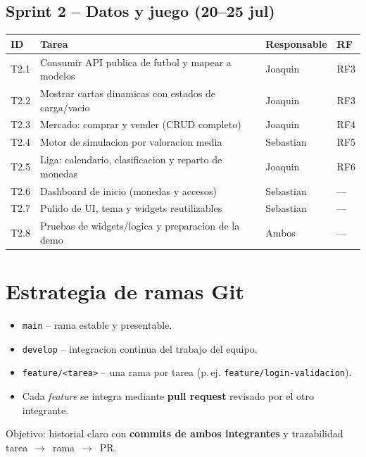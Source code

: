 \documentclass[11pt,a4paper]{article}
\begin{document}
\subsection{Sprint 2 -- Datos y juego (20--25 jul)}
\renewcommand{\arraystretch}{1.3}
\begin{longtable}{@{}C{1.2cm} L{7.6cm} L{3.4cm} C{2.2cm}@{}}
\toprule
\textbf{ID} & \textbf{Tarea} & \textbf{Responsable} & \textbf{RF} \\
\midrule
\endhead
T2.1 & Consumir API publica de futbol y mapear a modelos & Joaquin & RF3 \\
T2.2 & Mostrar cartas dinamicas con estados de carga/vacio & Joaquin & RF3 \\
T2.3 & Mercado: comprar y vender (CRUD completo) & Joaquin & RF4 \\
T2.4 & Motor de simulacion por valoracion media & Sebastian & RF5 \\
T2.5 & Liga: calendario, clasificacion y reparto de monedas & Joaquin & RF6 \\
T2.6 & Dashboard de inicio (monedas y accesos) & Sebastian & --- \\
T2.7 & Pulido de UI, tema y widgets reutilizables & Sebastian & --- \\
T2.8 & Pruebas de widgets/logica y preparacion de la demo & Ambos & --- \\
\bottomrule
\end{longtable}

\section{Estrategia de ramas Git}
\begin{itemize}[leftmargin=1.2em]
  \item \texttt{main} -- rama estable y presentable.
  \item \texttt{develop} -- integracion continua del trabajo del equipo.
  \item \texttt{feature/<tarea>} -- una rama por tarea (p.\,ej. \texttt{feature/login-validacion}).
  \item Cada \emph{feature} se integra mediante \textbf{pull request} revisado por el otro integrante.
\end{itemize}
Objetivo: historial claro con \textbf{commits de ambos integrantes} y trazabilidad
tarea~$\rightarrow$~rama~$\rightarrow$~PR.
\end{document}
